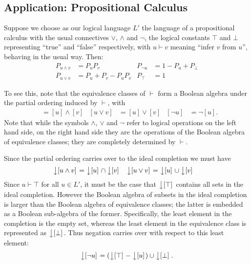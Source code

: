 \documentclass[12pt]{report}
\begin{document}
\subsection{Application: Propositional Calculus}

Suppose we choose as our logical language $L'$ the language of a propositional calculus with the usual connectives $\lor$, $\land$ and $\lnot$, the logical constants $\top$ and $\bot$ representing ``true'' and ``false'' respectively, with $u \vdash v$ meaning ``infer $v$ from $u$'', behaving in the usual way. Then:
\begin{align*}
P_{u\land v} &= P_uP_v
	& P_{\lnot u} &= 1 - P_u + P_\bot\\
P_{u\lor v} &= P_u + P_v - P_uP_v
	& P_{\top} &=1
\end{align*}

To see this, note that the equivalence classes of $\vdash$ form a Boolean algebra under the partial ordering induced by $\vdash$, with
\begin{align*}
[u\land v] & = [u] \land [v]
 & [u\lor v] & = [u] \lor [v]
  & [\lnot u] & = \lnot[u].
\end{align*}
Note that while the symbols $\land$, $\lor$ and $\lnot$ refer to logical operations on the left hand side, on the right hand side they are the operations of the Boolean algebra of equivalence classes; they are completely determined by $\vdash$.

Since the partial ordering carries over to the ideal completion we must have
\begin{align*}
\left\downarrow[u\land v]\right. &= \left\downarrow[u]\right. \cap \left\downarrow[v]\right.
& \left\downarrow[u\lor v]\right. &= \left\downarrow[u]\right. \cup \left\downarrow[v]\right.
\end{align*}
Since $u \vdash \top$ for all $u\in L'$, it must be the case that $\left\downarrow[\top]\right.$ contains all sets in the ideal completion. However the Boolean algebra of subsets in the ideal completion is larger than the Boolean algebra of equivalence classes; the latter is embedded as a Boolean sub-algebra of the former. Specifically, the least element in the completion is the empty set, whereas the least element in the equivalence class is represented as $\left\downarrow[\bot]\right.$. Thus negation carries over with respect to this least element:
$$\left\downarrow[\lnot u]\right. = (\left\downarrow[\top]\right. - \left\downarrow[u]\right.)\cup \left\downarrow[\bot]\right..$$
\end{document}
